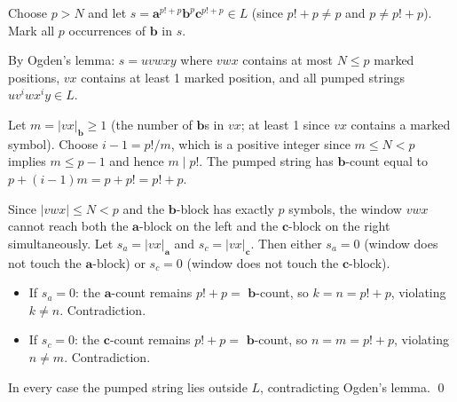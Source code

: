 \begin{enumerate}[{9.}1. ]
Choose $p > N$ and let $s = \pmb{a}^{p!+p}\pmb{b}^p\pmb{c}^{p!+p} \in L$ (since $p!+p \neq p$ and $p \neq p!+p$). Mark all $p$ occurrences of $\pmb{b}$ in $s$.

By Ogden's lemma: $s = uvwxy$ where $vwx$ contains at most $N \leq p$ marked positions, $vx$ contains at least 1 marked position, and all pumped strings $uv^i wx^i y \in L$.

Let $m = |vx|_{\pmb{b}} \geq 1$ (the number of $\pmb{b}$s in $vx$; at least 1 since $vx$ contains a marked symbol). Choose $i - 1 = p!/m$, which is a positive integer since $m \leq N < p$ implies $m \leq p-1$ and hence $m \mid p!$. The pumped string has $\pmb{b}$-count equal to $p + (i-1)m = p + p! = p!+p$.

Since $|vwx| \leq N < p$ and the $\pmb{b}$-block has exactly $p$ symbols, the window $vwx$ cannot reach both the $\pmb{a}$-block on the left and the $\pmb{c}$-block on the right simultaneously. Let $s_a = |vx|_{\pmb{a}}$ and $s_c = |vx|_{\pmb{c}}$. Then either $s_a = 0$ (window does not touch the $\pmb{a}$-block) or $s_c = 0$ (window does not touch the $\pmb{c}$-block).

\begin{itemize}
\item If $s_a = 0$: the $\pmb{a}$-count remains $p!+p = $ $\pmb{b}$-count, so $k = n = p!+p$, violating $k \neq n$. Contradiction.
\item If $s_c = 0$: the $\pmb{c}$-count remains $p!+p = $ $\pmb{b}$-count, so $n = m = p!+p$, violating $n \neq m$. Contradiction.
\end{itemize}

In every case the pumped string lies outside $L$, contradicting Ogden's lemma. \qed

\end{enumerate}
